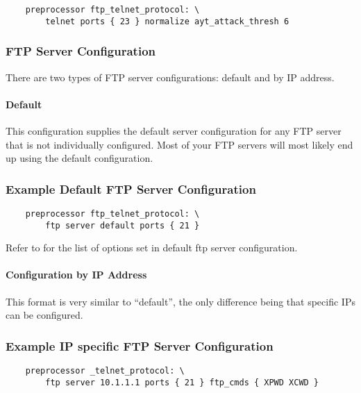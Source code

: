 \documentclass[english]{report}
\begin{document}
\begin{verbatim}
    preprocessor ftp_telnet_protocol: \
        telnet ports { 23 } normalize ayt_attack_thresh 6
\end{verbatim}

\subsubsection{FTP Server Configuration}

There are two types of FTP server configurations: default and by IP address.

\paragraph{Default}

This configuration supplies the default server configuration for any FTP server
that is not individually configured.  Most of your FTP servers will most likely
end up using the default configuration.

\subsubsection{Example Default FTP Server Configuration}

\begin{verbatim}
    preprocessor ftp_telnet_protocol: \
        ftp server default ports { 21 } 
\end{verbatim}

Refer to \pageref{sub:default ftp server config} for the list of options set in default ftp server configuration.

\paragraph{Configuration by IP Address}

This format is very similar to ``default'', the only difference being that
specific IPs can be configured.

\subsubsection{Example IP specific FTP Server Configuration}

\begin{verbatim}
    preprocessor _telnet_protocol: \
        ftp server 10.1.1.1 ports { 21 } ftp_cmds { XPWD XCWD }
\end{verbatim}
\end{document}
